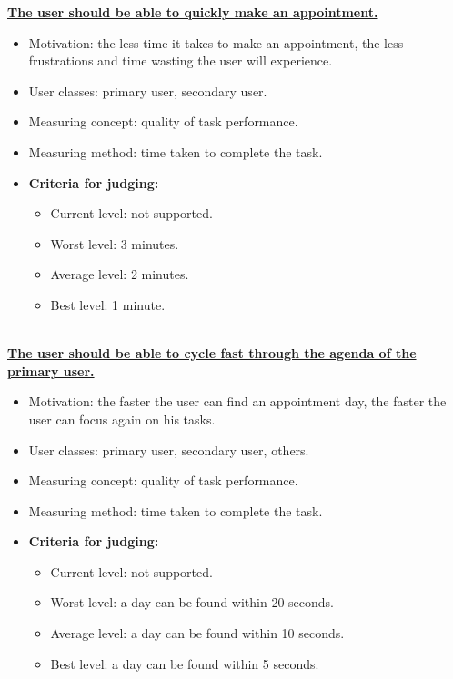 \documentclass[11pt, a4paper,svglistings]{report}
\begin{document}
\textbf{\underline{The user should be able to quickly make an appointment.}}
\begin{itemize}
\item{Motivation: the less time it takes to make an appointment, the less frustrations and time wasting the user will experience.}
\item{User classes: primary user, secondary user.}
\item{Measuring concept: quality of task performance.}
\item{Measuring method: time taken to complete the task.}
\item{\textbf{Criteria for judging:}}
\begin{itemize}
\item{Current level: not supported.}
\item{Worst level: 3 minutes.}
\item{Average level: 2 minutes.}
\item{Best level: 1 minute. \\ \\}
\end{itemize}
\end{itemize}
\textbf{\underline{The user should be able to cycle fast through the agenda of the primary user.}}
\begin{itemize}
\item{Motivation: the faster the user can find an appointment day, the faster the user can focus again on his tasks.}
\item{User classes: primary user, secondary user, others.}
\item{Measuring concept: quality of task performance.}
\item{Measuring method: time taken to complete the task.}
\item{\textbf{Criteria for judging:}}
\begin{itemize}
\item{Current level: not supported.}
\item{Worst level: a day can be found within 20 seconds.}
\item{Average level: a day can be found within 10 seconds.}
\item{Best level: a day can be found within 5 seconds. \\ \\}
\end{itemize}
\end{itemize}
\end{document}
